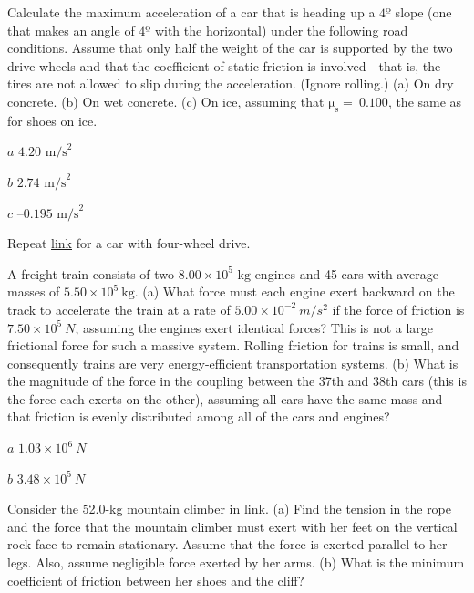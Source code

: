 \documentclass[
]{book}
\newenvironment{problems-exercises}{}{}
\begin{document}
\begin{problems-exercises}
\hypertarget{fs-id1924033}{}
\leavevmode\hypertarget{fs-id1924034}{}%
Calculate the maximum acceleration of a car that is heading up a
\(\text{4º}\) slope (one that makes an angle of \(\text{4º}\) with the
horizontal) under the following road conditions. Assume that only half
the weight of the car is supported by the two drive wheels and that the
coefficient of static friction is involved---that is, the tires are not
allowed to slip during the acceleration. (Ignore rolling.) (a) On dry
concrete. (b) On wet concrete. (c) On ice, assuming that
\(\text{μ}_{\text{s}} = \ \text{0.100}\), the same as for shoes on ice.

\leavevmode\hypertarget{fs-id2126956}{}%
\(a\) \({4\text{.}\text{20\ m/s}^{2}}{}\)

\(b\) \({2\text{.}\text{74\ m/s}^{2}}{}\)

\(c\) \({\text{–0}\text{.}\text{195\ m/s}^{2}}{}\)

\hypertarget{fs-id1742423}{}
\leavevmode\hypertarget{fs-id1742424}{}%
Repeat \protect\hyperlink{fs-id1924033}{link} for a car with
four-wheel drive.

\hypertarget{fs-id1439017}{}
\leavevmode\hypertarget{fs-id1279893}{}%
A freight train consists of two
\({8\text{.}{\text{00} \times \text{10}^{5}}\text{-kg}}{}\) engines and 45
cars with average masses of
\({5\text{.}{\text{50} \times \text{10}^{5}}\ \text{kg}}{}\). (a) What
force must each engine exert backward on the track to accelerate the
train at a rate of
\({5\text{.}{\text{00} \times \text{10}^{- 2}}\ {m/s^{2}}}{}\) if the
force of friction is \({7\text{.}{\text{50} \times \text{10}^{5}\ }N}{}\),
assuming the engines exert identical forces? This is not a large
frictional force for such a massive system. Rolling friction for trains
is small, and consequently trains are very energy-efficient
transportation systems. (b) What is the magnitude of the force in the
coupling between the 37th and 38th cars (this is the force each exerts
on the other), assuming all cars have the same mass and that friction is
evenly distributed among all of the cars and engines?

\leavevmode\hypertarget{fs-id1440508}{}%
\(a\) \({1\text{.}{\text{03} \times \text{10}^{6}\ }N}{}\)

\(b\) \({3\text{.}{\text{48} \times \text{10}^{5}}\ N}{}\)

\hypertarget{fs-id1615856}{}
\leavevmode\hypertarget{fs-id1615857}{}%
Consider the 52.0-kg mountain climber in
\protect\hyperlink{fs-id1165296580243}{link}. (a) Find the
tension in the rope and the force that the mountain climber must exert
with her feet on the vertical rock face to remain stationary. Assume
that the force is exerted parallel to her legs. Also, assume negligible
force exerted by her arms. (b) What is the minimum coefficient of
friction between her shoes and the cliff?


\end{problems-exercises}
\end{document}
